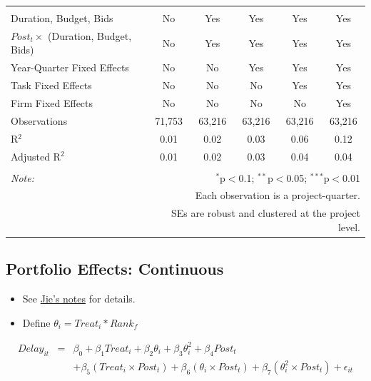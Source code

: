 \documentclass[
]{article}
\providecommand{\tightlist}{%
  \setlength{\itemsep}{0pt}\setlength{\parskip}{0pt}}
\begin{document}
\begin{table}[H]
\begin{tabular}{@{\extracolsep{-2pt}}lccccc}
  & & & & & \\ 
\hline \\[-1.8ex] 
Duration, Budget, Bids & No & Yes & Yes & Yes & Yes \\ 
$Post_t \times$  (Duration, Budget, Bids) & No & Yes & Yes & Yes & Yes \\ 
Year-Quarter Fixed Effects & No & No & Yes & Yes & Yes \\ 
Task Fixed Effects & No & No & No & Yes & Yes \\ 
Firm Fixed Effects & No & No & No & No & Yes \\ 
Observations & 71,753 & 63,216 & 63,216 & 63,216 & 63,216 \\ 
R$^{2}$ & 0.01 & 0.02 & 0.03 & 0.06 & 0.12 \\ 
Adjusted R$^{2}$ & 0.01 & 0.02 & 0.03 & 0.04 & 0.04 \\ 
\hline 
\hline \\[-1.8ex] 
\textit{Note:}  & \multicolumn{5}{r}{$^{*}$p$<$0.1; $^{**}$p$<$0.05; $^{***}$p$<$0.01} \\ 
 & \multicolumn{5}{r}{Each observation is a project-quarter.} \\ 
 & \multicolumn{5}{r}{SEs are robust and clustered at the project level.} \\ 
\end{tabular} 
\end{table}

\hypertarget{portfolio-effects-continuous}{%
\subsection{Portfolio Effects:
Continuous}\label{portfolio-effects-continuous}}

\begin{itemize}
\tightlist
\item
  See
  \href{https://github.com/QuickPay-Operational-Performance/Data-and-code/blob/master/notes/Portfolio\%20model\%2B0308.pdf}{Jie's
  notes} for details.
\item
  Define \(\theta_i = Treat_i*Rank_f\)
\end{itemize}

\[ \begin{aligned} Delay_{it}&=&\beta_0+\beta_1 Treat_i + \beta_2 \theta_i+\beta_3 \theta_i^2+\beta_4 Post_t\\&& + \beta_5 (Treat_i\times Post_t) + \beta_6 (\theta_i\times Post_t) +\beta_7 (\theta_i^2\times Post_t)+\epsilon_{it} \end{aligned} \]
\end{document}

